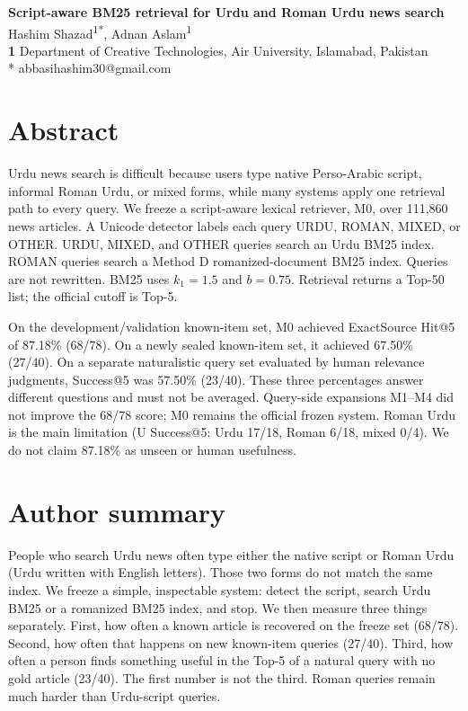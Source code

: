 \documentclass[10pt,letterpaper]{article}
\begin{document}
\vspace*{0.2in}

\begin{flushleft}
{\Large
\textbf{Script-aware BM25 retrieval for Urdu and Roman Urdu news search}
}
\newline
\\
Hashim Shazad\textsuperscript{1*},
Adnan Aslam\textsuperscript{1}
\\
\bigskip
\textbf{1} Department of Creative Technologies, Air University, Islamabad, Pakistan
\\
\bigskip
* abbasihashim30@gmail.com
\end{flushleft}

\section*{Abstract}

Urdu news search is difficult because users type native Perso-Arabic script, informal Roman Urdu, or mixed forms, while many systems apply one retrieval path to every query. We freeze a script-aware lexical retriever, M0, over 111,860 news articles. A Unicode detector labels each query URDU, ROMAN, MIXED, or OTHER. URDU, MIXED, and OTHER queries search an Urdu BM25 index. ROMAN queries search a Method D romanized-document BM25 index. Queries are not rewritten. BM25 uses \(k_1=1.5\) and \(b=0.75\). Retrieval returns a Top-50 list; the official cutoff is Top-5.

On the development/validation known-item set, M0 achieved ExactSource Hit@5 of 87.18\% (68/78). On a newly sealed known-item set, it achieved 67.50\% (27/40). On a separate naturalistic query set evaluated by human relevance judgments, Success@5 was 57.50\% (23/40). These three percentages answer different questions and must not be averaged. Query-side expansions M1--M4 did not improve the 68/78 score; M0 remains the official frozen system. Roman Urdu is the main limitation (U Success@5: Urdu 17/18, Roman 6/18, mixed 0/4). We do not claim 87.18\% as unseen or human usefulness.

\clearpage
{}
\linenumbers

\section*{Author summary}

People who search Urdu news often type either the native script or Roman Urdu (Urdu written with English letters). Those two forms do not match the same index. We freeze a simple, inspectable system: detect the script, search Urdu BM25 or a romanized BM25 index, and stop. We then measure three things separately. First, how often a known article is recovered on the freeze set (68/78). Second, how often that happens on new known-item queries (27/40). Third, how often a person finds something useful in the Top-5 of a natural query with no gold article (23/40). The first number is not the third. Roman queries remain much harder than Urdu-script queries.
\end{document}
